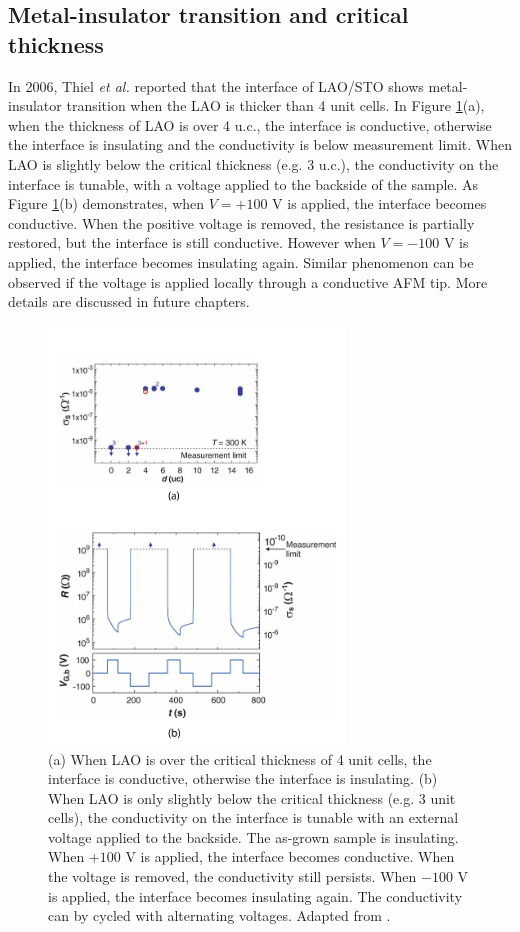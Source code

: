\documentclass[pdflatex, sectionletters, 12pt]{pittetd}    %
\begin{document}
\subsection{Metal-insulator transition and critical thickness}

In 2006, Thiel \textit{et al.} \cite{thiel2006tunable} reported that the interface of LAO/STO shows metal-insulator transition when the LAO is thicker than 4 unit cells. In Figure \ref{FIG:CriticalThickness}(a), when the thickness of LAO is over 4 u.c., the interface is conductive, otherwise the interface is insulating and the conductivity is below measurement limit. When LAO is slightly below the critical thickness (e.g. 3 u.c.), the conductivity on the interface is tunable, with a voltage applied to the backside of the sample. As Figure \ref{FIG:CriticalThickness}(b) demonstrates, when $V = +100$ V is applied, the interface becomes conductive. When the positive voltage is removed, the resistance is partially restored, but the interface is still conductive. However when $V = -100$ V is applied, the interface becomes insulating again. Similar phenomenon can be observed if the voltage is applied locally through a conductive AFM tip. More details are discussed in future chapters. 

\begin{figure}[p]
	\centering
	\includegraphics[width=0.7\textwidth]{Drawing/CriticalThickness.pdf}
	\caption{(a) When LAO is over the critical thickness of 4 unit cells, the interface is conductive, otherwise the interface is insulating. (b) When LAO is only slightly below the critical thickness (e.g. 3 unit cells), the conductivity on the interface is tunable with an external voltage applied to the backside. The as-grown sample is insulating. When $+100$ V is applied, the interface becomes conductive. When the voltage is removed, the conductivity still persists. When $-100$ V is applied, the interface becomes insulating again. The conductivity can by cycled with alternating voltages. Adapted from \cite{thiel2006tunable}.}
	\label{FIG:CriticalThickness}
\end{figure}
\end{document}
